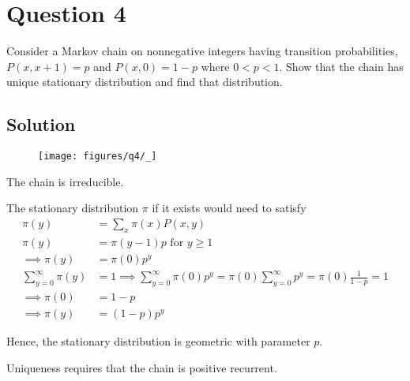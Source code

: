 \section*{Question 4}

Consider a Markov chain on nonnegative integers having transition probabilities, \( P(x, x+1)=p \) and \( P(x, 0)=1-p \) where \( 0<p<1 \).
Show that the chain has unique stationary distribution and find that distribution.

\subsection*{Solution}

\begin{figure}[h]
    \centering
    \texttt{[image: figures/q4/\_]}
\end{figure}

The chain is irreducible.

The stationary distribution \( \pi \) if it exists would need to satisfy
\begin{align*}
    \pi(y)
     & =
    \sum_{x} \pi(x) P(x, y)
    \\
    \pi(y)
     & =
    \pi(y-1) p
    \text{ for } y \geq 1
    \\
    \implies
    \pi(y)
     & =
    \pi(0) p^{y}
    \\
    \sum_{y=0}^{\infty} \pi(y)
     & =
    1
    \implies
    \sum_{y=0}^{\infty} \pi(0) p^{y}
    =
    \pi(0) \sum_{y=0}^{\infty} p^{y}
    =
    \pi(0) \frac{1}{1-p}
    =
    1
    \\
    \implies
    \pi(0)
     & =
    1-p
    \\
    \implies
    \pi(y)
     & =
    (1-p) p^{y}
\end{align*}

Hence, the stationary distribution is geometric with parameter \( p \).

Uniqueness requires that the chain is positive recurrent.
